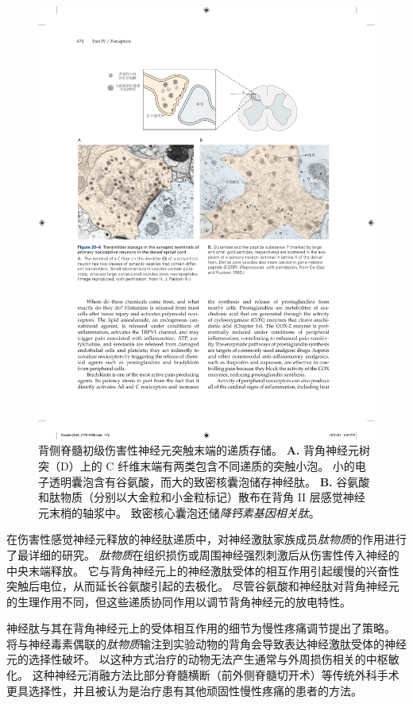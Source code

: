 \begin{figure}[htbp]
	\centering
	\includegraphics[width=1.0\linewidth]{chap20/fig_20_6}
	\caption{背侧脊髓初级伤害性神经元突触末端的递质存储。
		\textbf{A.} 背角神经元树突（D）上的 C 纤维末端有两类包含不同递质的突触小泡。
		小的电子透明囊泡含有谷氨酸，而大的致密核囊泡储存神经肽。
		\textbf{B.} 谷氨酸和肽物质（分别以大金粒和小金粒标记）散布在背角 II 层感觉神经元末梢的轴浆中。
		致密核心囊泡还储\textit{降钙素基因相关肽}\cite{de1990ultrastructural}。}
	\label{fig:20_6}
\end{figure}


在伤害性感觉神经元释放的神经肽递质中，对神经激肽家族成员\textit{肽物质}的作用进行了最详细的研究。
\textit{肽物质}在组织损伤或周围神经强烈刺激后从伤害性传入神经的中央末端释放。
它与背角神经元上的神经激肽受体的相互作用引起缓慢的兴奋性突触后电位，从而延长谷氨酸引起的去极化。
尽管谷氨酸和神经肽对背角神经元的生理作用不同，但这些递质协同作用以调节背角神经元的放电特性。


神经肽与其在背角神经元上的受体相互作用的细节为慢性疼痛调节提出了策略。
将与神经毒素偶联的\textit{肽物质}输注到实验动物的背角会导致表达神经激肽受体的神经元的选择性破坏。
以这种方式治疗的动物无法产生通常与外周损伤相关的中枢敏化。
这种神经元消融方法比部分脊髓横断（前外侧脊髓切开术）等传统外科手术更具选择性，并且被认为是治疗患有其他顽固性慢性疼痛的患者的方法。



